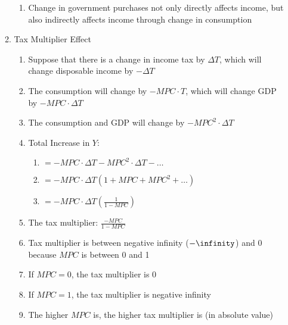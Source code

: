 \documentclass[12pt]{article}
\begin{document}
\begin{enumerate}
\begin{enumerate}
\begin{enumerate}
              \item Change in government purchases not only directly affects income, but also indirectly affects income through change in consumption

            \end{enumerate}

          \item Tax Multiplier Effect

            \begin{enumerate}

              \item Suppose that there is a change in income tax by $\Delta T$, which will change disposable income by $-\Delta T$

              \item The consumption will change by $-MPC\cdot T$, which will change GDP by $-MPC\cdot\Delta T$

              \item The consumption and GDP will change by $-MPC^2\cdot\Delta T$

              \item Total Increase in $Y$:

                \begin{enumerate}

                  \item $=-MPC\cdot\Delta T-MPC^2\cdot\Delta T-\dots$

                  \item $=-MPC\cdot\Delta T(1+MPC+MPC^2+\dots)$

                  \item $=-MPC\cdot\Delta T\left( \frac{1}{1-MPC} \right)$

                \end{enumerate}

              \item The tax multiplier: $\frac{-MPC}{1-MPC}$

              \item Tax multiplier is between negative infinity ($-\infinity$) and 0 because $MPC$ is between 0 and 1

              \item If $MPC=0$, the tax multiplier is 0

              \item If $MPC=1$, the tax multiplier is negative infinity

              \item The higher $MPC$ is, the higher tax multiplier is (in absolute value)


\end{enumerate}
\end{enumerate}
\end{enumerate}
\end{document}
